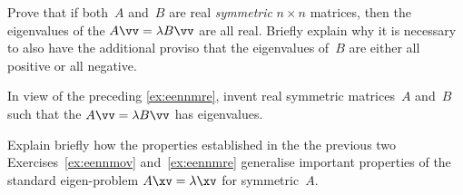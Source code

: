 \begin{exercise} \label{ex:eennmre} 
Prove that if both~\(A\) and~\(B\) are real \emph{symmetric} \(n\times n\) matrices, then the eigenvalues of the  \(A\vv=\lambda B\vv\) are all real.
Briefly explain why it is necessary to also have the additional proviso that the eigenvalues of~\(B\) are either all positive or all negative.
\end{exercise}


\begin{exercise} \label{ex:} 
In view of the preceding \autoref{ex:eennmre},
invent real symmetric matrices~\(A\) and~\(B\) such that the  \(A\vv=\lambda B\vv\) has  eigenvalues.
\end{exercise}



\begin{exercise} \label{ex:} 
Explain briefly how the properties established in the the previous two Exercises~\ref{ex:eennmov} and~\ref{ex:eennmre} generalise important properties of the standard eigen-problem \(A\xv=\lambda\xv\) for symmetric~\(A\).
\end{exercise}







